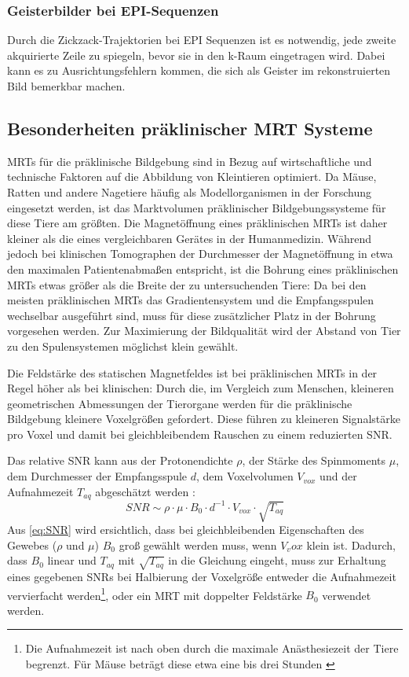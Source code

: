 \subsubsection{Geisterbilder bei EPI-Sequenzen}
Durch die Zickzack-Trajektorien bei EPI Sequenzen ist es notwendig, jede zweite akquirierte Zeile zu spiegeln, bevor sie in den k-Raum eingetragen wird. Dabei kann es zu Ausrichtungsfehlern kommen, die sich als Geister im rekonstruierten Bild bemerkbar machen\cite{Ianni2018}.

\subsection{Besonderheiten präklinischer MRT Systeme}
MRTs für die präklinische Bildgebung sind in Bezug auf wirtschaftliche und technische Faktoren auf die Abbildung von Kleintieren optimiert. Da Mäuse, Ratten und andere Nagetiere häufig als Modellorganismen in der Forschung eingesetzt werden, ist das Marktvolumen präklinischer Bildgebungssysteme für diese Tiere am größten. \cite{GBanimalStat} Die Magnetöffnung eines präklinischen MRTs ist daher kleiner als die eines vergleichbaren Gerätes in der Humanmedizin. Während jedoch bei klinischen Tomographen der Durchmesser der Magnetöffnung in etwa den maximalen Patientenabmaßen entspricht, ist die Bohrung eines präklinischen MRTs etwas größer als die Breite der zu untersuchenden Tiere: Da bei den meisten präklinischen MRTs das Gradientensystem und die Empfangsspulen wechselbar ausgeführt sind, muss für diese zusätzlicher Platz in der Bohrung vorgesehen werden. Zur Maximierung der Bildqualität wird der Abstand von Tier zu den Spulensystemen möglichst klein gewählt.

Die Feldstärke des statischen Magnetfeldes ist bei präklinischen MRTs in der Regel höher als bei klinischen: Durch die, im Vergleich zum Menschen, kleineren geometrischen Abmessungen der Tierorgane werden für die präklinische Bildgebung kleinere Voxelgrößen gefordert. Diese führen zu kleineren Signalstärke pro Voxel und damit bei gleichbleibendem Rauschen zu einem reduzierten SNR.

Das relative SNR kann aus der Protonendichte $\rho$, der Stärke des Spinmoments $\mu$, dem Durchmesser der Empfangsspule $d$, dem Voxelvolumen $V_{vox}$ und der Aufnahmezeit $T_{aq}$ abgeschätzt werden \cite[S.~161]{Kiessling2017}:
\begin{equation}
\label{eq:SNR}
	SNR \sim \rho \cdot \mu \cdot B_0 \cdot d^{-1} \cdot V_{vox} \cdot \sqrt{T_{aq}}
\end{equation}
Aus \autoref{eq:SNR} wird ersichtlich, dass bei gleichbleibenden Eigenschaften des Gewebes ($\rho$ und $\mu$) $B_0$ groß gewählt werden muss, wenn $V_vox$ klein ist.
Dadurch, dass $B_0$ linear und $T_{aq}$ mit $\sqrt{T_{aq}}$ in die Gleichung eingeht, muss zur Erhaltung eines gegebenen SNRs bei Halbierung der Voxelgröße entweder die Aufnahmezeit vervierfacht werden\footnote{Die Aufnahmezeit ist nach oben durch die maximale Anästhesiezeit der Tiere begrenzt. Für Mäuse beträgt diese etwa eine bis drei Stunden \cite{Kiessling2017}}, oder ein MRT mit doppelter Feldstärke $B_0$ verwendet werden.


